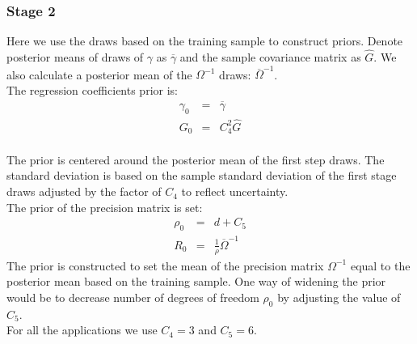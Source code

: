 \documentclass[12pt]{article}
\begin{document}
\subsubsection{Stage 2}
Here we use the draws based on the training sample to construct priors. Denote posterior means of draws of $\gamma$ as $\overline{\gamma}$ and the sample covariance matrix as $\widehat{G}$. We also calculate a posterior mean of the $\Omega^{-1}$ draws: $\overline{\Omega}^{-1}$.\\
The regression coefficients prior is:
\begin{eqnarray*}
	\gamma_{0} &=& \overline{\gamma} \\ 
	G_{0} &=& C_{4}^{2} \widehat{G}
\end{eqnarray*}\\
The prior is centered around the posterior mean of the first step draws. The standard deviation is based on the sample standard deviation of the first stage draws adjusted by the factor of $C_{4}$ to reflect uncertainty.\\
The prior of the precision matrix is set:
\begin{eqnarray*}
	\rho_{0} &=& d + C_{5} \\ 
	R_{0} &=& \frac{1}{\rho} \overline{\Omega}^{-1}
\end{eqnarray*}
The prior is constructed to set the mean of the precision matrix $\Omega^{-1}$ equal to the posterior mean based on the training sample. One way of widening the prior would be to decrease number of degrees of freedom $\rho_{0}$ by adjusting the value of $C_5$. \\
For all the applications we use $C_{4} = 3$ and $C_5 = 6$.
\end{document}
